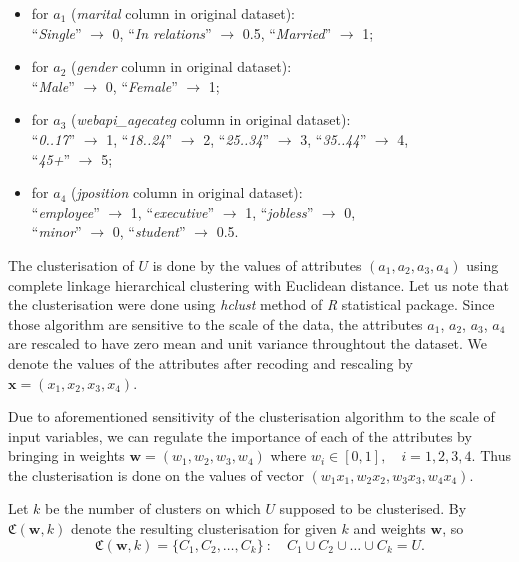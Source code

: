 \documentclass[runningheads,a4paper]{llncs}
\begin{document}
\begin{itemize}
\item for $a_1$ (\textit{marital} column in original dataset): \\ 
	``\textit{Single}''  $\to$ 0,  \qquad  ``\textit{In relations}''  $\to$ 0.5, \qquad  ``\textit{Married}''  $\to$ 1;
	\smallskip
	
\item for $a_2$ (\textit{gender} column in original dataset): \\ 
	``\textit{Male}''  $\to$ 0, \qquad  ``\textit{Female}'' $\to$ 1;
	\smallskip
	
\item for $a_3$ (\textit{webapi\_agecateg} column in original dataset): \\ 
	``\textit{0..17}''  $\to$ 1, \qquad  ``\textit{18..24}''  $\to$ 2, \qquad     ``\textit{25..34}''  $\to$ 3, \qquad  ``\textit{35..44}''  $\to$ 4, \\     ``\textit{45+}''  $\to$ 5;
	\smallskip
		
\item for $a_4$ (\textit{jposition} column in original dataset): \\ 
	``\textit{employee}'' $\to$ 1, \qquad  ``\textit{executive}'' $\to$ 1, \qquad  ``\textit{jobless}'' $\to$ 0, \\  ``\textit{minor}'' $\to$ 0, \qquad  ``\textit{student}'' $\to$ 0.5.
\end{itemize}

The clusterisation of $U$ is done by the values of attributes $(a_1, a_2, a_3, a_4)$ using complete linkage hierarchical clustering \cite{hclust} with Euclidean distance. Let us note that the clusterisation were done using \textit{hclust} method of \textit{R} statistical package. Since those algorithm are sensitive to the scale of the data, the attributes $a_1$, $a_2$, $a_3$, $a_4$ are rescaled to have zero mean and unit variance throughtout the dataset. We denote the values of the attributes after recoding and rescaling by $\boldsymbol{x} = (x_1, x_2, x_3, x_4)$.

Due to aforementioned sensitivity of the clusterisation algorithm to the scale of input variables, we can regulate the importance of each of the attributes by bringing in weights $\boldsymbol{w} = (w_1, w_2, w_3, w_4)$ where \quad $w_i \in [0, 1], \quad i = 1,2,3,4$. Thus the clusterisation is done on the values of vector $(w_1 x_1, w_2 x_2, w_3 x_3, w_4 x_4)$.

Let $k$ be the number of clusters on which $U$ supposed to be clusterised. By $\mathfrak{C}(\boldsymbol{w}, k)$ denote the resulting clusterisation for given $k$ and weights $\boldsymbol{w}$, so
\[
	\mathfrak{C}(\boldsymbol{w}, k) = \{C_1, C_2, \dots, C_k\} \  \colon  \quad  C_1 \cup C_2 \cup \dots \cup C_k = U.
\]
\end{document}
